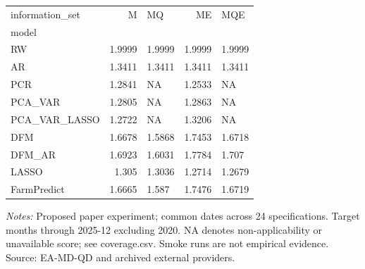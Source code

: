\begin{threeparttable}
\begin{tabular}{lrlrl}
\toprule
information\_set & M & MQ & ME & MQE \\
model &  &  &  &  \\
\midrule
RW & 1.9999 & 1.9999 & 1.9999 & 1.9999 \\
AR & 1.3411 & 1.3411 & 1.3411 & 1.3411 \\
PCR & 1.2841 & NA & 1.2533 & NA \\
PCA\_VAR & 1.2805 & NA & 1.2863 & NA \\
PCA\_VAR\_LASSO & 1.2722 & NA & 1.3206 & NA \\
DFM & 1.6678 & 1.5868 & 1.7453 & 1.6718 \\
DFM\_AR & 1.6923 & 1.6031 & 1.7784 & 1.707 \\
LASSO & 1.305 & 1.3036 & 1.2714 & 1.2679 \\
FarmPredict & 1.6665 & 1.587 & 1.7476 & 1.6719 \\
\bottomrule
\end{tabular}
\begin{tablenotes}[flushleft]\footnotesize
\item \textit{Notes:} Proposed paper experiment; common dates across 24 specifications. Target months through 2025-12 excluding 2020. NA denotes non-applicability or unavailable score; see coverage.csv. Smoke runs are not empirical evidence. Source: EA-MD-QD and archived external providers.
\end{tablenotes}
\end{threeparttable}
